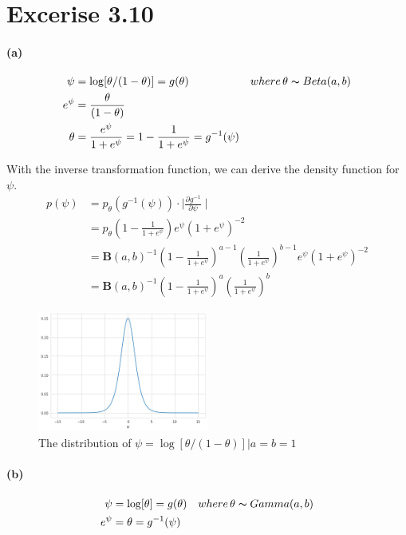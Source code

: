 \documentclass[11pt, letterpaper]{article}
\begin{document}
\section{Excerise 3.10}
\paragraph{(a)}
\begin{align*}
    \psi &= \log[\theta/(1-\theta)] = g(\theta) && where \, \theta \thicksim Beta(a, b) \\
    e^{\psi} &= \frac{\theta}{(1- \theta)} \\
    \theta &= \frac{e^{\psi}}{1+e^{\psi}} = 1 - \frac{1}{1+e^{\psi}} = g^{-1}(\psi)
\end{align*}

With the inverse transformation function, we can derive the density function for $\psi$.
\begin{align*}
    p(\psi) &= p_{\theta}(g^{-1}(\psi)) \cdot \mid \frac{\partial g^{-1}}{\partial \psi} \mid \\
      &= p_{\theta}(1 - \frac{1}{1+e^{\psi}}) e^{\psi} {(1+e^{\psi})}^{-2} \\
      &= {\mathbf{B}(a, b)}^{-1} {(1 - \frac{1}{1+e^{\psi}})}^{a-1} {(\frac{1}{1+e^{\psi}})}^{b-1} e^{\psi} {(1+e^{\psi})}^{-2} \\
      &= {\mathbf{B}(a, b)}^{-1} {(1 - \frac{1}{1+e^{\psi}})}^a {(\frac{1}{1+e^{\psi}})}^b
\end{align*}

\begin{figure}[h]
    \captionsetup{justification=centering, margin=2cm}
    \centering
    \includegraphics[width=0.5\textwidth]{hw2_3.10.a.png}
    \caption{The distribution of $\psi = \log[\theta/(1-\theta)]|a = b = 1$}
\end{figure}

\vspace{3in}

\paragraph{(b)}
\begin{align*}
    \psi &= \log[\theta] = g(\theta) && where \, \theta \thicksim Gamma(a, b) \\
    e^{\psi} &= \theta = g^{-1}(\psi)
\end{align*}
\end{document}
